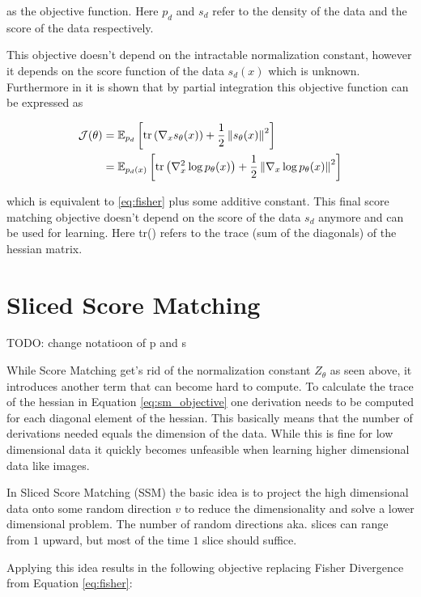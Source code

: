 as the objective function. Here $p_d$ and $s_d$ refer to the density of the data and the score of the data respectively.

This objective doesn't depend on the intractable normalization constant, however it depends on the score function of the data 
$s_d(x)$ which is unknown. Furthermore in \cite{sm} it is shown that by partial integration this objective function can be expressed as 

\begin{align}
    \label{eq:sm_objective}
    \mathcal{J}(\theta) & = \mathbb{E}_{p_d} \left[\text{tr} \left( \nabla_x s_\theta(x) \right) + \frac{1}{2} \left\| s_\theta(x) \right\|^2 \right] \notag \\ 
    & = \mathbb{E}_{p_d(x)} \left[\text{tr} \left( \nabla_x^2 \log p_\theta(x) \right) + \frac{1}{2} \left\| \nabla_x \log p_\theta(x) \right\|^2 \right]
\end{align}

which is equivalent to \ref{eq:fisher} plus some additive constant. This final score matching objective doesn't depend on the score of the data $s_d$ anymore and can be used for learning. Here tr() refers to the
trace (sum of the diagonals) of the hessian matrix.

\section{Sliced Score Matching}
\label{sec:ssm}

TODO: change notatioon of p and s

While Score Matching get's rid of the normalization constant $Z_\theta$ as seen above, it introduces another term that can become hard
to compute. To calculate the trace of the hessian in Equation \ref{eq:sm_objective} one derivation needs to be computed for each diagonal element of the hessian.
This basically means that the number of derivations needed equals the dimension of the data. 
While this is fine for low dimensional data it quickly becomes unfeasible when
learning higher dimensional data like images.  

In Sliced Score Matching (SSM) \cite{ssm} the basic idea is to project the high dimensional data onto some random direction $v$ to reduce 
the dimensionality and solve a lower dimensional problem. The number of random directions aka. slices can range from $1$ upward, but 
most of the time $1$ slice should suffice. 

Applying this idea results in the following objective replacing Fisher Divergence from Equation \ref{eq:fisher}: 

